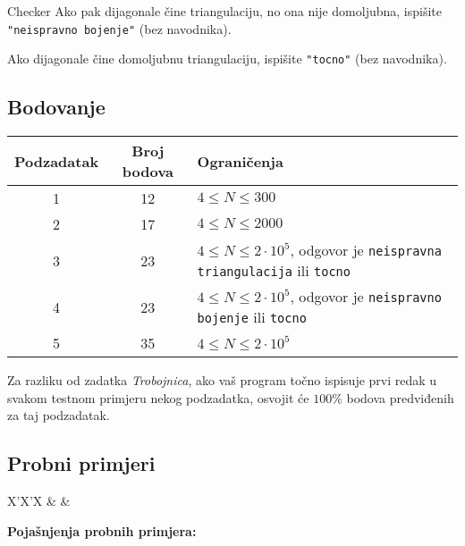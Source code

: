 \begin{statement}[
  problempoints=110,
  timelimit=3 sekunde,
  memorylimit=512 MiB,
]{Checker}
Ako pak dijagonale čine triangulaciju, no ona nije domoljubna, ispišite
\texttt{"neispravno bojenje"} (bez navodnika).

Ako dijagonale čine domoljubnu triangulaciju, ispišite \texttt{"tocno"}
(bez navodnika).

\subsection*{Bodovanje}
{\renewcommand{\arraystretch}{1.4}
  \setlength{\tabcolsep}{6pt}
  \begin{tabular}{ccl}
 Podzadatak & Broj bodova & Ograničenja \\ \midrule
  1 & 12 & $4 \le N \le 300$ \\
  2 & 17 & $4 \le N \le 2000$ \\
    3 & 23 & $4 \le N \le 2\cdot10^5$, odgovor je \texttt{neispravna triangulacija} ili \texttt{tocno} \\
    4 & 23 & $4 \le N \le 2\cdot10^5$, odgovor je \texttt{neispravno bojenje} ili \texttt{tocno} \\
  5 & 35 & $4 \le N \le 2\cdot10^5$
\end{tabular}}

Za razliku od zadatka \textit{Trobojnica}, ako vaš program točno ispisuje prvi redak u
svakom testnom primjeru nekog podzadatka, osvojit će $100\%$ bodova predviđenih
za taj podzadatak.

\subsection*{Probni primjeri}
\begin{tabularx}{\textwidth}{X'X'X}
 &
 &
\end{tabularx}


\textbf{Pojašnjenja probnih primjera:}

\end{statement}
